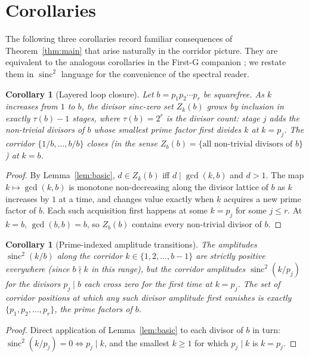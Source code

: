 \documentclass[11pt,reqno]{amsart}
\theoremstyle{plain}
\newtheorem{corollary}[theorem]{Corollary}
\theoremstyle{remark}
\DeclareMathOperator{\sinc}{sinc}
\begin{document}
\section{Corollaries}\label{sec:cor}

The following three corollaries record familiar consequences of
Theorem~\ref{thm:main} that arise naturally in the corridor
picture. They are equivalent to the analogous corollaries in the
First-G companion \cite{J41}; we restate them in $\sinc^2$ language
for the convenience of the spectral reader.

\begin{corollary}[Layered loop closure]\label{cor:loop}
Let $b = p_1 p_2 \cdots p_r$ be squarefree. As $k$ increases from
$1$ to $b$, the divisor sinc-zero set $Z_k(b)$ grows by inclusion in
exactly $\tau(b) - 1$ stages, where $\tau(b) = 2^r$ is the divisor
count: stage $j$ adds the non-trivial divisors of $b$ whose smallest
prime factor first divides $k$ at $k = p_{j}$. The corridor
$\{1/b, \ldots, b/b\}$ closes (in the sense $Z_b(b) = \{
\text{all non-trivial divisors of } b\}$) at $k = b$.
\end{corollary}

\begin{proof}
By Lemma~\ref{lem:basic}, $d \in Z_k(b)$ iff $d \mid \gcd(k, b)$ and
$d > 1$. The map $k \mapsto \gcd(k, b)$ is monotone non-decreasing
along the divisor lattice of $b$ as $k$ increases by $1$ at a time,
and changes value exactly when $k$ acquires a new prime factor of
$b$. Each such acquisition first happens at some $k = p_j$ for some
$j \le r$. At $k = b$, $\gcd(b, b) = b$, so $Z_b(b)$ contains every
non-trivial divisor of $b$.
\end{proof}

\begin{corollary}[Prime-indexed amplitude transitions]
\label{cor:prime-indexed}
The amplitudes $\sinc^2(k/b)$ along the corridor
$k \in \{1, 2, \ldots, b-1\}$ are strictly positive
\emph{everywhere} (since $b \nmid k$ in this range), but the
corridor amplitudes $\sinc^2(k/p_j)$ for the divisors
$p_j \mid b$ each cross zero for the first time at $k = p_j$.
The set of corridor positions at which any such divisor amplitude
first vanishes is exactly $\{p_1, p_2, \ldots, p_r\}$, the prime
factors of $b$.
\end{corollary}

\begin{proof}
Direct application of Lemma~\ref{lem:basic} to each divisor of $b$
in turn: $\sinc^2(k/p_j) = 0 \iff p_j \mid k$, and the smallest
$k \ge 1$ for which $p_j \mid k$ is $k = p_j$.
\end{proof}
\end{document}
